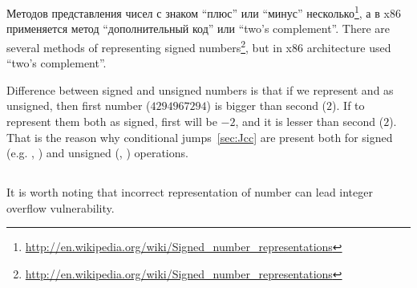 ﻿\section{\SignedNumbersSectionName}
\label{sec:signednumbers}

\newcommand{\URLS}{\url{http://en.wikipedia.org/wiki/Signed_number_representations}}

\IFRU
{Методов представления чисел с знаком ``плюс'' или ``минус'' несколько\footnote{\URLS}, 
а в x86 применяется метод ``дополнительный код'' или ``two's complement''.}
{There are several methods of representing signed numbers\footnote{\URLS}, 
but in x86 architecture used ``two's complement''.}

{Difference between signed and unsigned numbers is that if we represent  and  
as unsigned, then first number ($4294967294$) is bigger than second ($2$). 
If to represent them both as signed, first will be $-2$, and it is lesser than second ($2$). 
That is the reason why conditional jumps~\ref{sec:Jcc} are present both for signed (e.g. \JG, \JL) 
and unsigned (\JA, \JB) operations.}

\subsection{}

{It is worth noting that incorrect representation of number can lead integer overflow vulnerability.}

